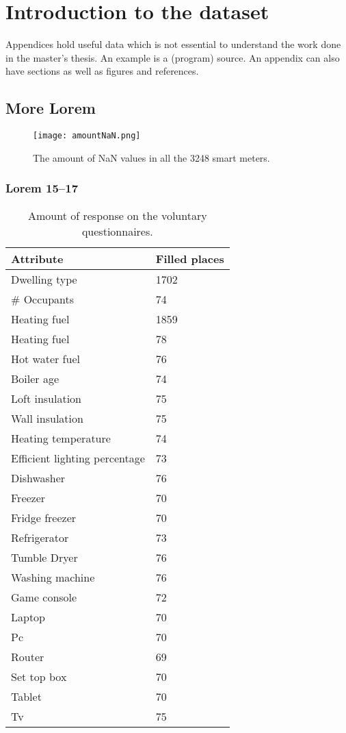 \chapter{Introduction to the dataset}
\label{app:A}
Appendices hold useful data which is not essential to understand the work
done in the master's thesis. An example is a (program) source.
An appendix can also have sections as well as figures and references\cite{h2g2}.

\section{More Lorem}

\begin{figure}[h!]
	\centering
	\texttt{[image: amountNaN.png]}
	\caption{The amount of NaN values in all the 3248 smart meters.}
	\label{fig:amountNaN}
\end{figure}
\subsection{Lorem 15--17}

\begin{table}[h]
	\centering
	\begin{tabular}{|p{5cm}|p{2.5cm}|}
		\hline
		\textbf{Attribute} & \textbf{Filled places}\\ \hline	
		Dwelling type  & 1702\\ \hline
		\# Occupants & 74\\ \hline
		Heating fuel & 1859\\ \hline
		Heating fuel & 78\\ \hline
		Hot water fuel & 76\\ \hline
		Boiler age & 74\\ \hline
		Loft insulation & 75\\ \hline
		Wall insulation & 75\\ \hline
		Heating temperature & 74\\ \hline
		Efficient lighting percentage & 73\\ \hline
		Dishwasher & 76\\ \hline
		Freezer & 70\\ \hline
		Fridge freezer & 70\\ \hline
		Refrigerator & 73\\ \hline
		Tumble Dryer & 76\\ \hline
		Washing machine & 76\\ \hline
		Game console &72\\ \hline
		Laptop & 70\\ \hline
		Pc & 70\\ \hline
		Router & 69\\ \hline
		Set top box & 70\\ \hline
		Tablet & 70\\ \hline
		Tv & 75\\ \hline
		
	\end{tabular}
	\caption{Amount of response on the voluntary questionnaires. }
	\label{tab:attributes}
\end{table}



